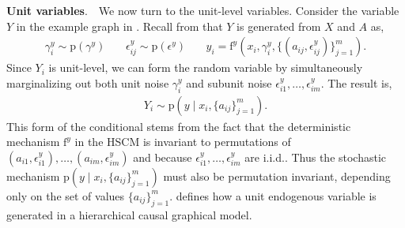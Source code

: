\documentclass[12pt]{article}
\newcommand{\pr}{\mathrm{p}}
\newcommand{\f}{\mathrm{f}}
\newcommand{\parhead}[1]{\vspace{0.1in} \noindent \textbf{#1}. \,\,}
\begin{document}
\parhead{Unit variables} We now turn to the unit-level variables.  Consider the variable $Y$ in the example graph in . Recall from  that $Y$ is generated from $X$ and $A$ as,
\begin{align*}
  \gamma_i^y \sim \pr(\gamma^y) \,\,\,\,\,\,\,\,\,\,\, \epsilon_{ij}^y \sim \pr(\epsilon^y) \,\,\,\,\,\,\,\,\,\,\, y_{i} = \f^y(x_i, \gamma_i^y, \{(a_{ij}, \epsilon_{ij}^y)\}_{j=1}^m).
\end{align*}
Since $Y_i$ is unit-level, we can form the random variable by simultaneously marginalizing out both unit noise $\gamma_i^{y}$ and subunit noise $\epsilon_{i1}^{y}, \ldots, \epsilon_{im}^{y}$. The result is,
\begin{align} \label{eqn:hcgm_unit}
  Y_i \sim \pr(y \mid x_i, \{a_{ij}\}_{j=1}^m).
\end{align}
This form of the conditional stems from the fact that the deterministic mechanism $\f^{y}$ in the HSCM is invariant to permutations of $(a_{i1}, \epsilon_{i1}^y), \ldots, (a_{im}, \epsilon_{im}^y)$ and because $\epsilon_{i1}^{y}, \ldots, \epsilon_{im}^{y}$ are i.i.d.. Thus the stochastic mechanism $\pr(y \mid x_i, \{a_{ij}\}_{j=1}^m)$ must also be permutation invariant, depending only on the set of values $\{a_{ij}\}_{j=1}^m$.  defines how a unit endogenous variable is generated in a hierarchical causal graphical model.
\end{document}
